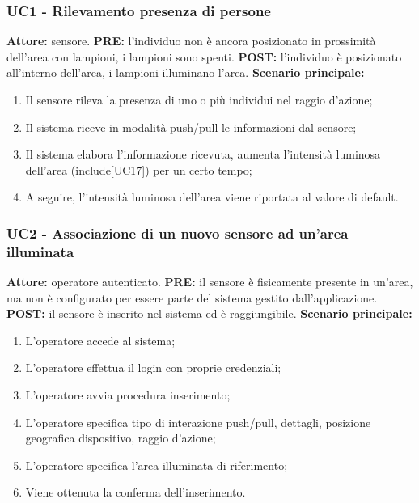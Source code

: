 \documentclass[a4paper, 12pt]{article}
\begin{document}
\subsubsection{UC1 - Rilevamento presenza di persone}
\textbf{Attore:} sensore.\newline
\textbf{PRE:} l'individuo non è ancora posizionato in prossimità dell'area con lampioni, i lampioni sono spenti.\newline
\textbf{POST:} l'individuo è posizionato all'interno dell'area, i lampioni illuminano l'area.\newline
\textbf{Scenario principale:}
\begin{enumerate}
    \item Il sensore rileva la presenza di uno o più individui nel raggio d'azione;
    \item Il sistema riceve in modalità push/pull le informazioni dal sensore;
    \item Il sistema elabora l'informazione ricevuta, aumenta l'intensità luminosa dell'area (include[UC17]) per un certo tempo;
    \item A seguire, l'intensità luminosa dell'area viene riportata al valore di default.
\end{enumerate}

\subsubsection{UC2 - Associazione di un nuovo sensore ad un'area illuminata}
\textbf{Attore:} operatore autenticato.\newline
\textbf{PRE:} il sensore è fisicamente presente in un'area, ma non è configurato per essere parte del sistema gestito dall'applicazione.\newline
\textbf{POST:} il sensore è inserito nel sistema ed è raggiungibile.\newline
\textbf{Scenario principale:}
\begin{enumerate}
    \item L'operatore accede al sistema;
    \item L'operatore effettua il login con proprie credenziali;
    \item L'operatore avvia procedura inserimento;
    \item L'operatore specifica tipo di interazione push/pull, dettagli, posizione geografica dispositivo, raggio d'azione;
    \item L'operatore specifica l'area illuminata di riferimento;
    \item Viene ottenuta la conferma dell'inserimento.
\end{enumerate}
\end{document}
